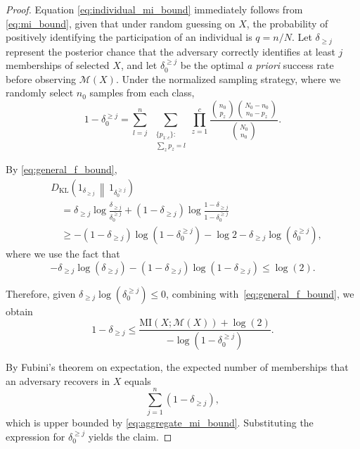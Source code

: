 \documentclass[letterpaper]{article} %
\begin{document}
\begin{proof}

Equation \eqref{eq:individual_mi_bound} immediately follows from \eqref{eq:mi_bound}, given that under random guessing on $X$, the probability of positively identifying the participation of an individual is $q = n/N$. Let $\delta_{\ge j}$ represent the posterior chance that the adversary correctly identifies at least $j$ memberships of selected $X$, and let $\delta_{0}^{\ge j}$ be the optimal \emph{a priori} success rate before observing $\mathcal{M}(X)$. Under the normalized sampling strategy, where we randomly select $n_0$ samples from each class,
\[
1 - \delta_{0}^{\ge j}
=
\sum_{l=j}^{n}\;
\sum_{\substack{\{p_{1:c}\}:\\ \sum_z p_z = l}}
\prod_{z=1}^c
\frac{\binom{n_0}{p_z}
\binom{N_0 - n_0}{n_0 - p_z}}
{\binom{N_0}{n_0}}.
\]


By \eqref{eq:general_f_bound},
\begin{align*}
&D_{\mathrm{KL}}\!\left(1_{\delta_{\ge j}} \,\middle\|\, 1_{\delta_0^{\ge j}}\right)
\\
&\quad=
\delta_{\ge j} \log\!\frac{\delta_{\ge j}}{\delta_0^{\ge j}}
+
(1-\delta_{\ge j}) \log\!\frac{1-\delta_{\ge j}}{1-\delta_0^{\ge j}}
\\
&\quad\ge
-(1{-}\delta_{\ge j}) \log(1{-}\delta_0^{\ge j})
- \log 2
- \delta_{\ge j} \log(\delta_0^{\ge j}),
\end{align*}
where we use the fact that
\[
-\delta_{\ge j} \log(\delta_{\ge j})
- (1-\delta_{\ge j}) \log(1-\delta_{\ge j})
\le \log(2).
\]

Therefore, given $\delta_{\ge j} \log(\delta_0^{\ge j}) \le 0$, combining with~\eqref{eq:general_f_bound}, we obtain
\begin{equation}\label{eq:aggregate_mi_bound}
1 - \delta_{\ge j}
\le
\frac{\mathrm{MI}(X;\mathcal{M}(X)) + \log(2)}
{-\log(1-\delta_0^{\ge j})}.
\end{equation}

By Fubini's theorem on expectation, the expected number of memberships that an adversary recovers in $X$ equals
\[
\sum_{j=1}^{n} (1 - \delta_{\ge j}),
\]
which is upper bounded by \eqref{eq:aggregate_mi_bound}. Substituting the expression for $\delta_0^{\ge j}$ yields the claim.

\end{proof}
\end{document}
